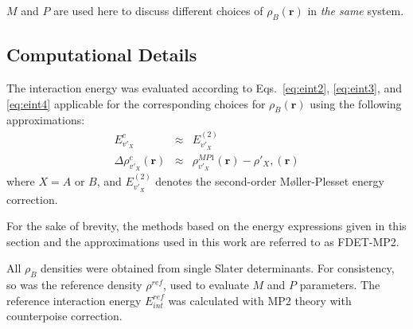 \documentclass[amsmath,amssymb,preprint,aip,jcp]{revtex4-1}
\begin{document}
$M$ and $P$ are used here to discuss different choices of $\rho_{B}(\mathbf{r})$ in {\it the same} system. 
\subsection{Computational Details}
The interaction energy was evaluated according to Eqs.~\ref{eq:eint2}, \ref{eq:eint3}, and \ref{eq:eint4} applicable for the corresponding choices for $\rho_B(\mathbf{r})$ using the following approximations:
\begin{eqnarray}
E^{c}_{v'_X}&\approx&E_{v'_X}^{(2)} \label{eq:appr_ec}\\
\Delta \rho^{c}_{v'_X}(\mathbf{r})&\approx&\rho_{v'_X}^{MP1}(\mathbf{r})-\rho'_{X},(\mathbf{r}) \label{eq:appr_rc}
\end{eqnarray}
where $X=A$ or $B$, and $E_{v'_X}^{(2)}$ denotes the second-order M{\o}ller-Plesset energy correction.

For the sake of brevity, the methods based on the energy expressions given in this section and the approximations used in this work are referred to as FDET-MP2. 

All $\rho_B$ densities were obtained from single Slater determinants. For consistency, so was the reference density $\rho^{ref}$, used to evaluate $M$ and $P$ parameters.
The reference interaction energy $E_{int}^{ref}$ was calculated with MP2 theory with counterpoise correction.
\end{document}
